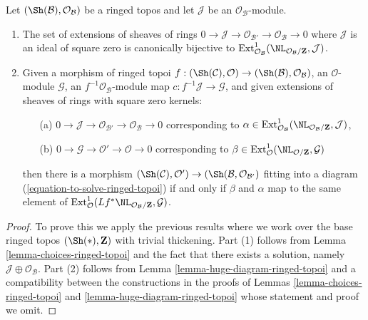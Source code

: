 \begin{lemma}
\label{lemma-extensions-of-ringed-topoi}
Let $(\Sh(\mathcal{B}), \mathcal{O}_\mathcal{B})$ be a ringed topos
and let $\mathcal{J}$ be an $\mathcal{O}_\mathcal{B}$-module.
\begin{enumerate}
\item The set of extensions of sheaves of rings
$0 \to \mathcal{J} \to \mathcal{O}_{\mathcal{B}'} \to
\mathcal{O}_\mathcal{B} \to 0$
where $\mathcal{J}$ is an ideal of square zero is canonically bijective to
$\text{Ext}^1_{\mathcal{O}_\mathcal{B}}(
\NL_{\mathcal{O}_\mathcal{B}/\mathbf{Z}}, \mathcal{J})$.
\item Given a morphism of ringed topoi
$f : (\Sh(\mathcal{C}), \mathcal{O}) \to
(\Sh(\mathcal{B}), \mathcal{O}_\mathcal{B})$, an $\mathcal{O}$-module
$\mathcal{G}$, an $f^{-1}\mathcal{O}_\mathcal{B}$-module map
$c : f^{-1}\mathcal{J} \to \mathcal{G}$, and
given extensions of sheaves of rings with square zero kernels:
\begin{enumerate}
\item[(a)] $0 \to \mathcal{J} \to \mathcal{O}_{\mathcal{B}'} \to
\mathcal{O}_\mathcal{B} \to 0$ corresponding to
$\alpha \in \text{Ext}^1_{\mathcal{O}_\mathcal{B}}(
\NL_{\mathcal{O}_\mathcal{B}/\mathbf{Z}}, \mathcal{J})$,
\item[(b)] $0 \to \mathcal{G} \to \mathcal{O}' \to \mathcal{O} \to 0$
corresponding to
$\beta \in \text{Ext}^1_\mathcal{O}(\NL_{\mathcal{O}/\mathbf{Z}}, \mathcal{G})$
\end{enumerate}
then there is a morphism $(\Sh(\mathcal{C}), \mathcal{O}') \to
(\Sh(\mathcal{B}, \mathcal{O}_{\mathcal{B}'})$ fitting into a diagram
(\ref{equation-to-solve-ringed-topoi}) if and only if $\beta$ and $\alpha$
map to the same element of
$\text{Ext}^1_\mathcal{O}(
Lf^*\NL_{\mathcal{O}_\mathcal{B}/\mathbf{Z}}, \mathcal{G})$.
\end{enumerate}
\end{lemma}

\begin{proof}
To prove this we apply the previous results where we work over
the base ringed topos $(\Sh(*), \mathbf{Z})$ with trivial thickening.
Part (1) follows from Lemma \ref{lemma-choices-ringed-topoi}
and the fact that there exists a solution, namely
$\mathcal{J} \oplus \mathcal{O}_\mathcal{B}$.
Part (2) follows from Lemma \ref{lemma-huge-diagram-ringed-topoi}
and a compatibility between the constructions in the proofs
of Lemmas \ref{lemma-choices-ringed-topoi} and
\ref{lemma-huge-diagram-ringed-topoi}
whose statement and proof we omit.
\end{proof}








